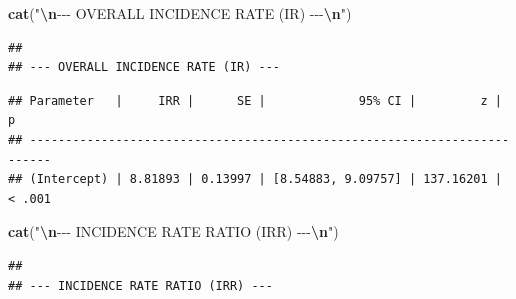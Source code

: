 \documentclass[
]{article}
\newenvironment{Shaded}{\begin{snugshade}}{\end{snugshade}}
\newcommand{\AttributeTok}[1]{\textcolor[rgb]{0.13,0.29,0.53}{#1}}
\newcommand{\ConstantTok}[1]{\textcolor[rgb]{0.56,0.35,0.01}{#1}}
\newcommand{\DecValTok}[1]{\textcolor[rgb]{0.00,0.00,0.81}{#1}}
\newcommand{\FunctionTok}[1]{\textcolor[rgb]{0.13,0.29,0.53}{\textbf{#1}}}
\newcommand{\NormalTok}[1]{#1}
\newcommand{\OtherTok}[1]{\textcolor[rgb]{0.56,0.35,0.01}{#1}}
\newcommand{\SpecialCharTok}[1]{\textcolor[rgb]{0.81,0.36,0.00}{\textbf{#1}}}
\newcommand{\StringTok}[1]{\textcolor[rgb]{0.31,0.60,0.02}{#1}}
\begin{document}
\begin{Shaded}
\begin{Highlighting}[]
\FunctionTok{cat}\NormalTok{(}\StringTok{"}\SpecialCharTok{\textbackslash{}n}\StringTok{{-}{-}{-} OVERALL INCIDENCE RATE (IR) {-}{-}{-}}\SpecialCharTok{\textbackslash{}n}\StringTok{"}\NormalTok{)}
\end{Highlighting}
\end{Shaded}

\begin{verbatim}
## 
## --- OVERALL INCIDENCE RATE (IR) ---
\end{verbatim}

\begin{Shaded}
\end{Shaded}

\begin{verbatim}
## Parameter   |     IRR |      SE |             95% CI |         z |      p
## -------------------------------------------------------------------------
## (Intercept) | 8.81893 | 0.13997 | [8.54883, 9.09757] | 137.16201 | < .001
\end{verbatim}

\begin{Shaded}
\begin{Highlighting}[]
\FunctionTok{cat}\NormalTok{(}\StringTok{"}\SpecialCharTok{\textbackslash{}n}\StringTok{{-}{-}{-} INCIDENCE RATE RATIO (IRR) {-}{-}{-}}\SpecialCharTok{\textbackslash{}n}\StringTok{"}\NormalTok{)}
\end{Highlighting}
\end{Shaded}

\begin{verbatim}
## 
## --- INCIDENCE RATE RATIO (IRR) ---
\end{verbatim}

\begin{Shaded}
\end{Shaded}
\end{document}
